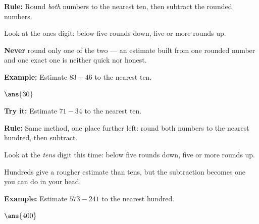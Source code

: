 \documentclass[12pt]{article}
\begin{document}


\begin{formulabox}
\textbf{Rule:} Round \emph{both} numbers to the nearest ten, then subtract the rounded numbers.\par
Look at the ones digit: below five rounds down, five or more rounds up.\par
\textbf{Never} round only one of the two --- an estimate built from one rounded number and one exact one is neither quick nor honest.
\end{formulabox}

\begin{examplebox}
\textbf{Example:} \quad Estimate $83 - 46$ to the nearest ten.

$\ans{30}$
\end{examplebox}

\begin{tryitbox}
\textbf{Try it:} \quad Estimate $71 - 34$ to the nearest ten.\\[2pt]
\end{tryitbox}


\begin{formulabox}
\textbf{Rule:} Same method, one place further left: round both numbers to the nearest hundred, then subtract.\par
Look at the \emph{tens} digit this time: below five rounds down, five or more rounds up.\par
Hundreds give a rougher estimate than tens, but the subtraction becomes one you can do in your head.
\end{formulabox}

\begin{examplebox}
\textbf{Example:} \quad Estimate $573 - 241$ to the nearest hundred.

$\ans{400}$
\end{examplebox}
\end{document}
